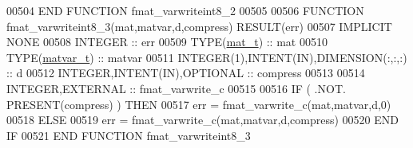 \begin{DoxyCode}
00504 \textcolor{keyword}{END FUNCTION }fmat\_varwriteint8\_2
00505 
00506 \textcolor{keyword}{FUNCTION }fmat\_varwriteint8\_3(mat,matvar,d,compress) \textcolor{keyword}{RESULT}(err)
00507 \textcolor{keywordtype}{IMPLICIT NONE}
00508     \textcolor{keywordtype}{INTEGER}                                  :: err
00509     \textcolor{keywordtype}{TYPE}(\hyperlink{group___m_a_t_gab0fc888f5a5d79943b16284b1f91c2e8}{mat\_t})                              :: mat
00510     \textcolor{keywordtype}{TYPE}(\hyperlink{group___m_a_t_structmatvar__t}{matvar\_t})                           :: matvar
00511     \textcolor{keywordtype}{INTEGER(1)},\textcolor{keywordtype}{INTENT(IN)},\textcolor{keywordtype}{DIMENSION(:,:,:)}   :: d
00512     \textcolor{keywordtype}{INTEGER},\textcolor{keywordtype}{INTENT(IN)},\textcolor{keywordtype}{OPTIONAL}              :: compress
00513 
00514     \textcolor{keywordtype}{INTEGER},\textcolor{keywordtype}{EXTERNAL}                         :: fmat\_varwrite\_c
00515 
00516     \textcolor{keywordflow}{IF} ( .NOT. \textcolor{keyword}{PRESENT}(compress) ) \textcolor{keywordflow}{THEN}
00517         err = fmat\_varwrite\_c(mat,matvar,d,0)
00518     \textcolor{keywordflow}{ELSE}
00519         err = fmat\_varwrite\_c(mat,matvar,d,compress)
00520 \textcolor{keywordflow}{    END IF}
00521 \textcolor{keyword}{END FUNCTION }fmat\_varwriteint8\_3
\end{DoxyCode}
